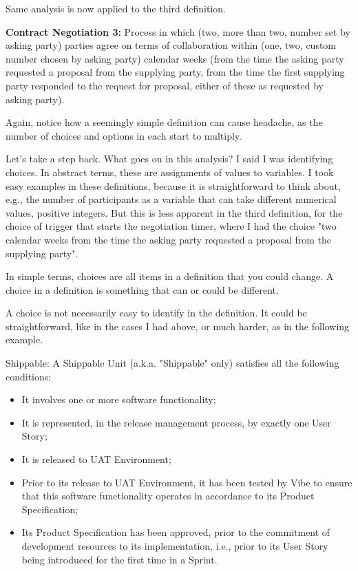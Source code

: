 \documentclass[graybox,envcountchap,sectrefs]{svmono}
\begin{document}
Same analysis is now applied to the third definition.

\begin{svgraybox}
\textbf{Contract Negotiation 3:} Process in which (two, more than two, number set by asking party) parties agree on terms of collaboration within (one, two, custom number chosen by asking party) calendar weeks (from the time the asking party requested a proposal from the supplying party, from the time the first supplying party responded to the request for proposal, either of these as requested by asking party).
\end{svgraybox}

Again, notice how a seemingly simple definition can cause headache, as the number of choices and options in each start to multiply.

Let's take a step back. What goes on in this analysis? I said I was identifying choices. In abstract terms, these are assignments of values to variables. I took easy examples in these definitions, because it is straightforward to think about, e.g., the number of participants as a variable that can take different numerical values, positive integers. But this is less apparent in the third definition, for the choice of trigger that starts the negotiation timer, where I had the choice "two calendar weeks from the time the asking party requested a proposal from the supplying party".

In simple terms, choices are all items in a definition that you could change. A choice in a definition is something that can or could be different.

A choice is not necessarily easy to identify in the definition. It could be straightforward, like in the cases I had above, or much harder, as in the following example.

\begin{svgraybox}
Shippable: A Shippable Unit (a.k.a. "Shippable" only) satisfies all the following conditions:
\begin{itemize}
	\item It involves one or more software functionality;
	\item It is represented, in the release management process, by exactly one User Story;
	\item It is released to UAT Environment;
	\item Prior to its release to UAT Environment, it has been tested by Vibe to ensure that this software functionality operates in accordance to its Product Specification;
	\item Its Product Specification has been approved, prior to the commitment of development resources to its implementation, i.e., prior to its User Story being introduced for the first time in a Sprint.
\end{itemize}
\end{svgraybox}
\end{document}
